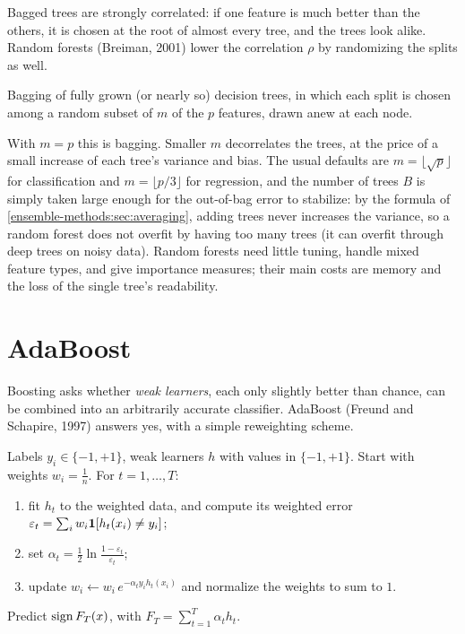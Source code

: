 \begin{notechapter}
Bagged trees are strongly correlated: if one feature is much better than the others, it
is chosen at the root of almost every tree, and the trees look alike. Random forests
(Breiman, 2001) lower the correlation $\rho$ by randomizing the splits as well.

\begin{definition}
Bagging of fully grown (or nearly so) decision trees, in which each split is chosen
among a random subset of $m$ of the $p$ features, drawn anew at each node.
\end{definition}

With $m = p$ this is bagging. Smaller $m$ decorrelates the trees, at the price of a small
increase of each tree's variance and bias. The usual defaults are $m = \lfloor\sqrt p\rfloor$ for
classification and $m = \lfloor p/3\rfloor$ for regression, and the number of trees $B$ is simply taken large
enough for the out-of-bag error to stabilize: by the formula of
\cref{ensemble-methods:sec:averaging}, adding trees never increases the variance, so a random
forest does not overfit by having too many trees (it can overfit through deep trees on
noisy data). Random forests need little tuning, handle mixed feature types, and give
importance measures; their main costs are memory and the loss of the single tree's
readability.

\section{AdaBoost}\label{ensemble-methods:sec:adaboost}

Boosting asks whether \emph{weak learners}, each only slightly better than chance, can be
combined into an arbitrarily accurate classifier. AdaBoost (Freund and Schapire, 1997)
answers yes, with a simple reweighting scheme.

\begin{definition}[AdaBoost]\label{ensemble-methods:def:adaboost}
Labels $y_i\in\{-1, +1\}$, weak learners $h$ with values in $\{-1, +1\}$. Start with weights $w_i = \frac1n$. For
$t = 1,\dots,T$:
\begin{enumerate}[nosep]
  \item fit $h_t$ to the weighted data, and compute its weighted error $\varepsilon_t = \sum_iw_i\mathbf{1}[h_t(x_i)\neq y_i]$;
  \item set $\alpha_t = \frac12\ln\frac{1 - \varepsilon_t}{\varepsilon_t}$;
  \item update $w_i\leftarrow w_i\,e^{-\alpha_ty_ih_t(x_i)}$ and normalize the weights to sum to $1$.
\end{enumerate}
Predict $\operatorname{sign} F_T(x)$, with $F_T = \sum_{t=1}^T\alpha_th_t$.
\end{definition}


\end{notechapter}
